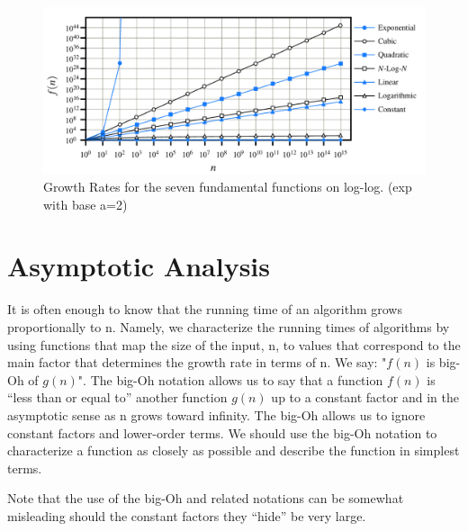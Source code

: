 \documentclass[../Main.tex]{subfiles}
\begin{document}
\begin{figure}[H]
    \centering
    \includegraphics[width=1\linewidth]{Images/growthrates.png}
    \caption{Growth Rates for the seven fundamental functions on log-log. (exp with base a=2)}
\end{figure}
\newpage

\section{Asymptotic Analysis}
It is often enough to know that the running time of an algorithm grows proportionally to n.
Namely, we characterize the running times of algorithms
by using functions that map the size of the input, n, to values that correspond to
the main factor that determines the growth rate in terms of n.
We say: "\(f(n)\) is big-Oh of \(g(n)\)".
The big-Oh notation allows us to say that a function \(f(n)\) is “less than or equal
to” another function \(g(n)\) up to a constant factor and in the asymptotic sense as n
grows toward infinity. The big-Oh allows us to ignore constant factors and lower-order terms.
We should use the big-Oh notation to characterize a function as closely
as possible and describe the function in simplest terms.

Note that the use of the big-Oh and related notations can be somewhat misleading 
should the constant factors they “hide” be very large. 
\end{document}
